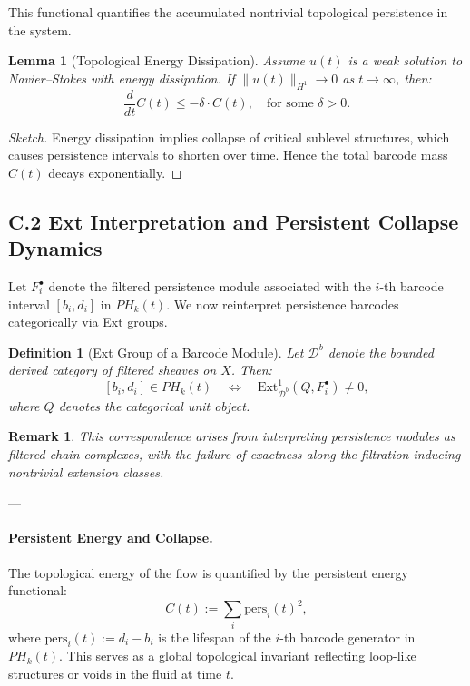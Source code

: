 \documentclass[11pt]{article}
\newtheorem{definition}[theorem]{Definition}
\newtheorem{remark}[theorem]{Remark}
\newtheorem{lemma}[theorem]{Lemma}
\begin{document}
This functional quantifies the accumulated nontrivial topological persistence in the system.

\begin{lemma}[Topological Energy Dissipation]
Assume $u(t)$ is a weak solution to Navier--Stokes with energy dissipation.  
If $\|u(t)\|_{H^1} \to 0$ as $t \to \infty$, then:
\[
\frac{d}{dt} C(t) \leq -\delta \cdot C(t), \quad \text{for some } \delta > 0.
\]
\end{lemma}

\begin{proof}[Sketch]
Energy dissipation implies collapse of critical sublevel structures, which causes persistence intervals to shorten over time.  
Hence the total barcode mass $C(t)$ decays exponentially.
\end{proof}

\subsection*{C.2 Ext Interpretation and Persistent Collapse Dynamics}

Let \( F^\bullet_i \) denote the filtered persistence module associated with the \( i \)-th barcode interval \( [b_i, d_i] \) in \( PH_k(t) \).  
We now reinterpret persistence barcodes categorically via Ext groups.

\begin{definition}[Ext Group of a Barcode Module]
Let \( \mathcal{D}^b \) denote the bounded derived category of filtered sheaves on \( X \).  
Then:
\[
[b_i, d_i] \in PH_k(t) 
\quad \Longleftrightarrow \quad 
\mathrm{Ext}^1_{\mathcal{D}^b}(Q, F^\bullet_i) \neq 0,
\]
where \( Q \) denotes the categorical unit object.
\end{definition}

\begin{remark}
This correspondence arises from interpreting persistence modules as filtered chain complexes,  
with the failure of exactness along the filtration inducing nontrivial extension classes.
\end{remark}

---

\paragraph{Persistent Energy and Collapse.}

The topological energy of the flow is quantified by the persistent energy functional:
\[
C(t) := \sum_{i} \mathrm{pers}_i(t)^2,
\]
where \( \mathrm{pers}_i(t) := d_i - b_i \) is the lifespan of the \( i \)-th barcode generator in \( PH_k(t) \).  
This serves as a global topological invariant reflecting loop-like structures or voids in the fluid at time \( t \).
\end{document}
